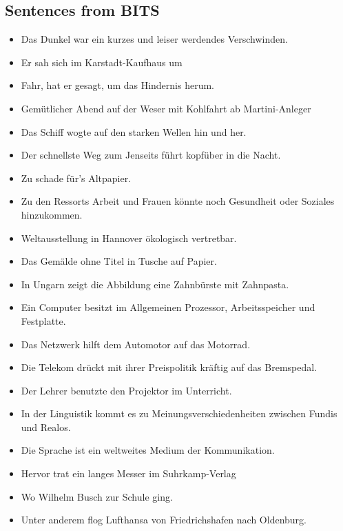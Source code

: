 \documentclass[a4paper, 12pt]{article}
\begin{document}
\begin{appendix}
\subsection{Sentences from BITS}
\begin{itemize}
\item Das Dunkel war ein kurzes und leiser werdendes Verschwinden.
\item Er sah sich im Karstadt-Kaufhaus um
\item Fahr, hat er gesagt, um das Hindernis herum.
\item Gemütlicher Abend auf der Weser mit Kohlfahrt ab Martini-Anleger
\item Das Schiff wogte auf den starken Wellen hin und her.
\item Der schnellste Weg zum Jenseits führt kopfüber in die Nacht.
\item Zu schade für's Altpapier.
\item Zu den Ressorts Arbeit und Frauen könnte noch Gesundheit oder Soziales hinzukommen.
\item Weltausstellung in Hannover ökologisch vertretbar.
\item Das Gemälde ohne Titel in Tusche auf Papier.
\item In Ungarn zeigt die Abbildung eine Zahnbürste mit Zahnpasta.
\item Ein Computer besitzt im Allgemeinen Prozessor, Arbeitsspeicher und Festplatte.
\item Das Netzwerk hilft dem Automotor auf das Motorrad.
\item Die Telekom drückt mit ihrer Preispolitik kräftig auf das Bremspedal.
\item Der Lehrer benutzte den Projektor im Unterricht.
\item In der Linguistik kommt es zu Meinungsverschiedenheiten zwischen Fundis und Realos.
\item Die Sprache ist ein weltweites Medium der Kommunikation.
\item Hervor trat ein langes Messer im Suhrkamp-Verlag
\item Wo Wilhelm Busch zur Schule ging.
\item Unter anderem flog Lufthansa von Friedrichshafen nach Oldenburg.
\end{itemize}
\end{appendix}
\end{document}
